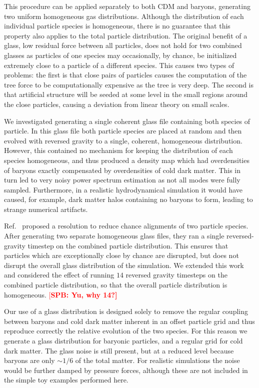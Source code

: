 \documentclass[a4paper,11pt]{article}
\newcommand{\spb}[1]{\textcolor{red}{[\bf SPB: #1]} }
\begin{document}
This procedure can be applied separately to both CDM and baryons, generating two uniform homogeneous gas distributions.
Although the distribution of each individual particle species is homogeneous, there is no guarantee that this property also applies to
the total particle distribution. The original benefit of a glass, low residual force between all particles, does not hold for two combined glasses \cite{Yoshida:2003} as particles of one species may occasionally, by chance, be initialized extremely close to a particle of a different species. This causes two types of problems: the first is that close pairs of particles causes the computation of the tree force to be computationally expensive as the tree is very deep. The second is that artificial structure will be seeded at some level in the small regions around the close particles, causing a deviation from linear theory on small scales.

We investigated generating a single coherent glass file containing both species of particle. In this glass file both particle species are placed at random and then evolved with reversed gravity to a single, coherent, homogeneous distribution. However, this contained no mechanism for keeping the distribution of each species homogeneous, and thus produced a density map which had overdensities of baryons exactly compensated by overdensities of cold dark matter. This in turn led to very noisy power spectrum estimation as not all modes were fully sampled. Furthermore, in a realistic hydrodynamical simulation it would have caused, for example, dark matter halos containing no baryons to form, leading to strange numerical artifacts.

Ref.~\cite{Yoshida:2003} proposed a resolution to reduce chance alignments of two particle species. After generating two separate homogeneous glass files, they ran a single reversed-gravity timestep on the combined particle distribution. This ensures that particles which are exceptionally close by chance are disrupted, but does not disrupt the overall glass distribution of the simulation. We extended this work and considered the effect of running $14$ reversed gravity timesteps on the combined particle distribution, so that the overall particle distribution is homogeneous. \spb{Yu, why 14?}

Our use of a glass distribution is designed solely to remove the regular coupling between baryons and cold dark matter inherent in an offset particle grid and thus reproduce correctly the relative evolution of the two species. For this reason we generate a glass distribution for baryonic particles, and a regular grid for cold dark matter. The glass noise is still present, but at a reduced level because baryons are only $\sim 1/6$ of the total matter. For realistic simulations the noise would be further damped by pressure forces, although these are not included in the simple toy examples performed here.
\end{document}
